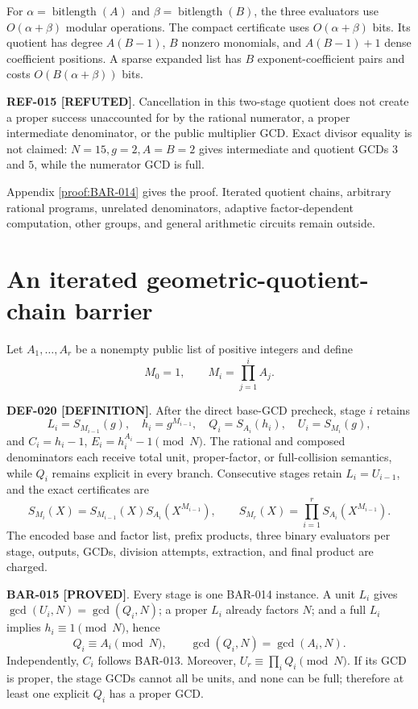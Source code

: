 \documentclass[11pt]{article}
\newcommand{\claimstatus}[2]{\textbf{#1 [#2]}}
\begin{document}
For \(\alpha=\operatorname{bitlength}(A)\) and
\(\beta=\operatorname{bitlength}(B)\), the three evaluators use
\(O(\alpha+\beta)\) modular operations. The compact certificate uses
\(O(\alpha+\beta)\) bits. Its quotient has degree \(A(B-1)\), \(B\) nonzero
monomials, and \(A(B-1)+1\) dense coefficient positions. A sparse expanded
list has \(B\) exponent-coefficient pairs and costs
\(O(B(\alpha+\beta))\) bits.

\claimstatus{REF-015}{REFUTED}. Cancellation in this two-stage quotient does
not create a proper success unaccounted for by the rational numerator, a
proper intermediate denominator, or the public multiplier GCD. Exact divisor
equality is not claimed: \(N=15,g=2,A=B=2\) gives intermediate and quotient
GCDs \(3\) and \(5\), while the numerator GCD is full.

Appendix \ref{proof:BAR-014} gives the proof. Iterated quotient chains,
arbitrary rational programs, unrelated denominators, adaptive
factor-dependent computation, other groups, and general arithmetic circuits
remain outside.

\section{An iterated geometric-quotient-chain barrier}

Let \(A_1,\ldots,A_r\) be a nonempty public list of positive integers and
define
\[
M_0=1,\qquad M_i=\prod_{j=1}^{i}A_j.
\]

\claimstatus{DEF-020}{DEFINITION}. After the direct base-GCD precheck, stage
\(i\) retains
\[
L_i=S_{M_{i-1}}(g),\quad h_i=g^{M_{i-1}},\quad
Q_i=S_{A_i}(h_i),\quad U_i=S_{M_i}(g),
\]
and \(C_i=h_i-1\), \(E_i=h_i^{A_i}-1\pmod N\). The rational and composed
denominators each receive total unit, proper-factor, or full-collision
semantics, while \(Q_i\) remains explicit in every branch. Consecutive
stages retain \(L_i=U_{i-1}\), and the exact certificates are
\[
S_{M_i}(X)=S_{M_{i-1}}(X)S_{A_i}(X^{M_{i-1}}),
\qquad
S_{M_r}(X)=\prod_{i=1}^{r}S_{A_i}(X^{M_{i-1}}).
\]
The encoded base and factor list, prefix products, three binary evaluators per
stage, outputs, GCDs, division attempts, extraction, and final product are
charged.

\claimstatus{BAR-015}{PROVED}. Every stage is one BAR-014 instance. A unit
\(L_i\) gives \(\gcd(U_i,N)=\gcd(Q_i,N)\); a proper \(L_i\) already factors
\(N\); and a full \(L_i\) implies \(h_i\equiv1\pmod N\), hence
\[
Q_i\equiv A_i\pmod N,\qquad \gcd(Q_i,N)=\gcd(A_i,N).
\]
Independently, \(C_i\) follows BAR-013. Moreover,
\(U_r\equiv\prod_iQ_i\pmod N\). If its GCD is proper, the stage GCDs cannot
all be units, and none can be full; therefore at least one explicit \(Q_i\)
has a proper GCD.
\end{document}
